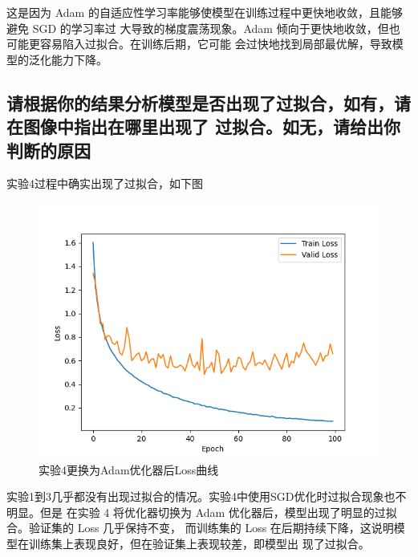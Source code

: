 \documentclass{article}%
\begin{document}
这是因为 Adam 的自适应性学习率能够使模型在训练过程中更快地收敛，且能够避免 SGD 的学习率过
大导致的梯度震荡现象。Adam 倾向于更快地收敛，但也可能更容易陷入过拟合。在训练后期，它可能
会过快地找到局部最优解，导致模型的泛化能力下降。

\subsection{请根据你的结果分析模型是否出现了过拟合，如有，请在图像中指出在哪里出现了
过拟合。如无，请给出你判断的原因}
实验4过程中确实出现了过拟合，如下图
\begin{figure}[H]
    \centering
    \includegraphics[width=0.6\linewidth]{Loss_6.png}
    \caption{实验4更换为Adam优化器后Loss曲线}
\end{figure}

实验1到3几乎都没有出现过拟合的情况。实验4中使用SGD优化时过拟合现象也不明显。但是
在实验 4 将优化器切换为 Adam 优化器后，模型出现了明显的过拟合。验证集的 Loss 几乎保持不变， 
而训练集的 Loss 在后期持续下降，这说明模型在训练集上表现良好，但在验证集上表现较差，即模型出 
现了过拟合。
\end{document}
